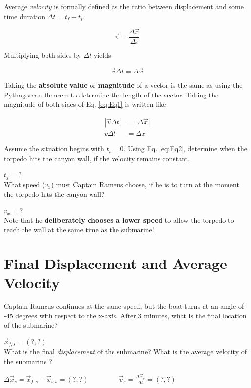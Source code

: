 \documentclass{article}
\begin{document}
Average \textit{velocity} is formally defined as the ratio between displacement and some time duration $\Delta t = t_f - t_i$.

\begin{equation}
\vec{v} = \frac{\Delta \vec{x}}{\Delta t}
\end{equation}

Multiplying both sides by $\Delta t$ yields

\begin{equation}
\vec{v}\Delta t = \Delta \vec{x} \label{eq:Eq1}
\end{equation}

Taking the \textbf{absolute value} or \textbf{magnitude} of a vector is the same as using the Pythagorean theorem to determine the length of the vector.  Taking the magnitude of both sides of Eq. \ref{eq:Eq1} is written like

\begin{align}
|\vec{v}\Delta t| &= |\Delta \vec{x}| \\
v\Delta t &= \Delta x \label{eq:Eq2}
\end{align}

Assume the situation begins with $t_i = 0$.  Using Eq. \ref{eq:Eq2}, determine when the torpedo hits the canyon wall, if the velocity remains constant. \\ \vspace{1cm}

$t_f = ?$ \\

What speed ($v_x$) must Captain Rameus choose, if he is to turn at the moment the torpedo hits the canyon wall? \\ \vspace{3cm}

$v_x = ?$ \\

Note that he \textbf{deliberately chooses a lower speed} to allow the torpedo to reach the wall at the same time as the submarine!

\section{Final Displacement and Average Velocity}

Captain Rameus continues at the same speed, but the boat turns at an angle of -45 degrees with respect to the x-axis.  After 3 minutes, what is the final location of the submarine? \\ \vspace{2cm}

$\vec{x}_{f,s} = (?,?)$ \\

What is the final \textit{displacement} of the submarine?  What is the average velocity of the submarine ? \\ \vspace{2cm}

$\Delta \vec{x}_s = \vec{x}_{f,s} - \vec{x}_{i,s} = (?,?) ~~~~~~~~~~~~~~~~~~~~ \vec{v}_s = \frac{\Delta \vec{x}_s}{\Delta t} = (?,?)$ \\
\end{document}

